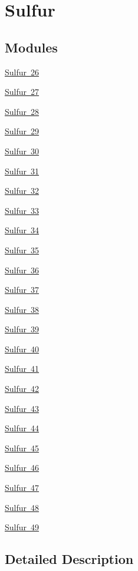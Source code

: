 \hypertarget{group___isotope_const-_sulfur}{}\section{Sulfur}
\label{group___isotope_const-_sulfur}
\subsection*{Modules}
\begin{DoxyCompactItemize}
\item 
\mbox{\hyperlink{group___isotope_const-_sulfur-_s26}{Sulfur 26}}
\item 
\mbox{\hyperlink{group___isotope_const-_sulfur-_s27}{Sulfur 27}}
\item 
\mbox{\hyperlink{group___isotope_const-_sulfur-_s28}{Sulfur 28}}
\item 
\mbox{\hyperlink{group___isotope_const-_sulfur-_s29}{Sulfur 29}}
\item 
\mbox{\hyperlink{group___isotope_const-_sulfur-_s30}{Sulfur 30}}
\item 
\mbox{\hyperlink{group___isotope_const-_sulfur-_s31}{Sulfur 31}}
\item 
\mbox{\hyperlink{group___isotope_const-_sulfur-_s32}{Sulfur 32}}
\item 
\mbox{\hyperlink{group___isotope_const-_sulfur-_s33}{Sulfur 33}}
\item 
\mbox{\hyperlink{group___isotope_const-_sulfur-_s34}{Sulfur 34}}
\item 
\mbox{\hyperlink{group___isotope_const-_sulfur-_s35}{Sulfur 35}}
\item 
\mbox{\hyperlink{group___isotope_const-_sulfur-_s36}{Sulfur 36}}
\item 
\mbox{\hyperlink{group___isotope_const-_sulfur-_s37}{Sulfur 37}}
\item 
\mbox{\hyperlink{group___isotope_const-_sulfur-_s38}{Sulfur 38}}
\item 
\mbox{\hyperlink{group___isotope_const-_sulfur-_s39}{Sulfur 39}}
\item 
\mbox{\hyperlink{group___isotope_const-_sulfur-_s40}{Sulfur 40}}
\item 
\mbox{\hyperlink{group___isotope_const-_sulfur-_s41}{Sulfur 41}}
\item 
\mbox{\hyperlink{group___isotope_const-_sulfur-_s42}{Sulfur 42}}
\item 
\mbox{\hyperlink{group___isotope_const-_sulfur-_s43}{Sulfur 43}}
\item 
\mbox{\hyperlink{group___isotope_const-_sulfur-_s44}{Sulfur 44}}
\item 
\mbox{\hyperlink{group___isotope_const-_sulfur-_s45}{Sulfur 45}}
\item 
\mbox{\hyperlink{group___isotope_const-_sulfur-_s46}{Sulfur 46}}
\item 
\mbox{\hyperlink{group___isotope_const-_sulfur-_s47}{Sulfur 47}}
\item 
\mbox{\hyperlink{group___isotope_const-_sulfur-_s48}{Sulfur 48}}
\item 
\mbox{\hyperlink{group___isotope_const-_sulfur-_s49}{Sulfur 49}}
\end{DoxyCompactItemize}


\subsection{Detailed Description}
